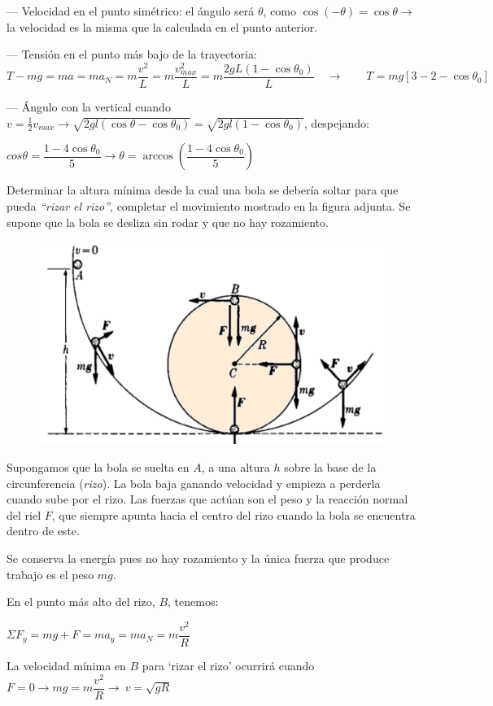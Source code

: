 --- Velocidad en el punto simétrico: el ángulo será $\theta$, como $\cos (-\theta)=\cos \theta \to $ la velocidad es la misma que la calculada en el punto anterior.

--- Tensión en el punto más bajo de la trayectoria: $T-mg=ma=ma_N=m\dfrac {v^2}{L}=m\dfrac{v_{max}^2}{L}=m\dfrac{2gL(1-\cos \theta_0)}{L} \quad \to \qquad T=mg\left[ 3-2-\cos \theta_0 \right]$

--- Ángulo con la vertical cuando $v=\frac {1}{2}v_{max} \to  \sqrt{2gl(\cos \theta-\cos \theta_0)}=\sqrt{2gl(1-\cos \theta_0)}$, despejando: 

$ cos \theta=\dfrac {1-4\cos \theta_0}{5} \to  \theta= \arccos \left( \dfrac {1-4\cos \theta_0}{5}\right)$


\begin{prob}
\begin{multicols}{2}
Determinar la altura mínima desde la cual una bola se debería soltar para que pueda \emph{``rizar el rizo''}, completar el movimiento mostrado en la figura adjunta. Se supone que la bola se desliza sin rodar y que no hay rozamiento.	
\begin{figure}[H]
	\centering
	\includegraphics[width=.4\textwidth]{imagenes/imagenes04/T04IM16.png}
\end{figure}
\end{multicols}
\end{prob}
Supongamos que la bola se suelta en $A$, a una altura $h$ sobre la base de la circunferencia (\emph{rizo}). La bola baja ganando velocidad y empieza a perderla cuando sube por el rizo. Las fuerzas que actúan son el peso y la reacción normal del riel $F$, que siempre apunta hacia el centro del rizo cuando la bola se encuentra dentro de este. 

Se conserva la energía pues no hay rozamiento y la única fuerza que produce trabajo es el peso $mg$.

En el punto más alto del rizo, $B$, tenemos:

$\Sigma F_y=mg+F=ma_y=ma_N=m\dfrac {v^2}R$

La velocidad mínima en $B$ para `rizar el rizo' ocurrirá cuando $F=0   \to mg=m\dfrac {v^2}R \to \ v=\sqrt{gR}$

